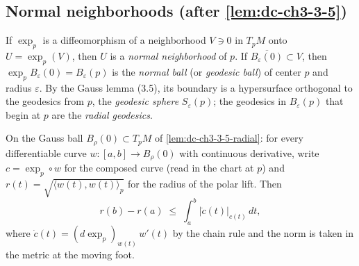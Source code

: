 \subsection{Normal neighborhoods (after \cref{lem:dc-ch3-3-5})}
If $\exp_p$ is a diffeomorphism of a neighborhood $V\ni 0$ in $T_pM$ onto
$U=\exp_p(V)$, then $U$ is a \emph{normal neighborhood} of $p$. If
$\overline{B_\varepsilon(0)}\subset V$, then $\exp_p B_\varepsilon(0)=B_\varepsilon(p)$
is the \emph{normal ball} (or \emph{geodesic ball}) of center $p$ and radius $\varepsilon$.
By the Gauss lemma (3.5), its boundary is a hypersurface orthogonal to the
geodesics from $p$, the \emph{geodesic sphere} $S_\varepsilon(p)$; the geodesics in
$B_\varepsilon(p)$ that begin at $p$ are the \emph{radial geodesics}.

\begin{lemma}
  \label{lem:dc-ch3-3-6-radius}
  \leanok
  On the Gauss ball $B_\rho(0)\subset T_pM$ of \cref{lem:dc-ch3-3-5-radial}: for
  every differentiable curve $w:[a,b]\to B_\rho(0)$ with continuous derivative,
  write $c=\exp_p\circ w$ for the composed curve (read in the chart at $p$) and
  $r(t)=\sqrt{\langle w(t),w(t)\rangle_p}$ for the radius of the polar lift.
  Then
  $$r(b)-r(a)\;\le\;\int_a^b\big|\dot c(t)\big|_{c(t)}\,dt,$$
  where $\dot c(t)=(d\exp_p)_{w(t)}\,w'(t)$ by the chain rule and the norm is
  taken in the metric at the moving foot.
\end{lemma}
